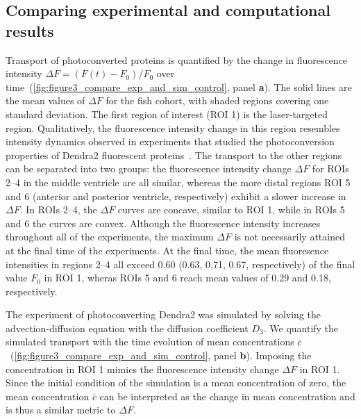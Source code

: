 \documentclass[fleqn]{wlscirep}
\begin{document}
\subsection*{Comparing experimental and computational results}
Transport of photoconverted proteins is quantified by the change in fluorescence intensity $\Delta F=(F(t)-F_0)/F_0$ over time~(\cref{fig:figure3_compare_exp_and_sim_control}, panel \textbf{a}). The solid lines are the mean values of $\Delta F$ for the fish cohort, with shaded regions covering one standard deviation. The first region of interest (ROI 1) is the laser-targeted region. Qualitatively, the fluorescence intensity change in this region resembles intensity dynamics observed in experiments that studied the photoconversion properties of Dendra2 fluorescent proteins~\cite{Makarov2014Steady-stateDendra2}. The transport to the other regions can be separated into two groups: the fluorescence intensity change $\Delta F$ for ROIs 2--4 in the middle ventricle are all similar, whereas the more distal regions ROI 5 and 6 (anterior and posterior ventricle, respectively) exhibit a slower increase in $\Delta F$. In ROIs 2--4, the $\Delta F$ curves are concave, similar to ROI 1, while in ROIs 5 and 6 the curves are convex. Although the fluorescence intensity increases throughout all of the experiments, the maximum $\Delta F$ is not necessarily attained at the final time of the experiments. At the final time, the mean fluoresence intensities in regions 2--4 all exceed 0.60 (0.63, 0.71, 0.67, respectively) of the final value $F_0$ in ROI 1, wheras ROIs 5 and 6 reach mean values of 0.29 and 0.18, respectively.


The experiment of photoconverting Dendra2 was simulated by solving the advection-diffusion equation with the diffusion coefficient $D_3$. We quantify the simulated transport with the time evolution of mean concentrations $\overline{c}$~(\cref{fig:figure3_compare_exp_and_sim_control}, panel \textbf{b}). Imposing the concentration in ROI 1 mimics the fluorescence intensity change $\Delta F$ in ROI 1. Since the initial condition of the simulation is a mean concentration of zero, the mean concentration $\overline{c}$ can be interpreted as the change in mean concentration and is thus a similar metric to $\Delta F$.
\end{document}
